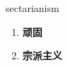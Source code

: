 
\begin{frame}
{\huge sectarianism}
\begin{center}
\begin{enumerate}\Large
  \item \textbf{顽固}
  \item \textbf{宗派主义}
\end{enumerate}
\end{center}
\end{frame}
